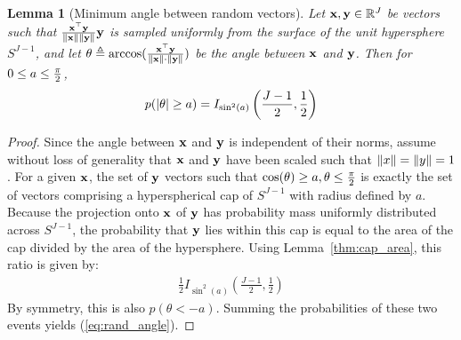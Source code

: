 \documentclass[]{article}
\newtheorem{lemma}{Lemma}[section]
\begin{document}

\begin{lemma}[Minimum angle between random vectors] \label{thm:rand_angle}
Let $\mathbf{x}, \mathbf{y} \in \mathbb{R}^J$ be vectors such that $\frac{\mathbf{x}^\top\mathbf{y}}{\lVert\mathbf{x}\rVert\lVert\mathbf{y}\rVert} \mathbf{y}$ is sampled uniformly from the surface of the unit hypersphere $S^{J-1}$, and let $\theta \triangleq \arccos(\frac{\mathbf{x}^\top\mathbf{y}}{\lVert\mathbf{x}\rVert \cdot \lVert\mathbf{y}\rVert })$ be the angle between $\mathbf{x}$ and $\mathbf{y}$. Then for $0 \le a \le \frac{\pi}{2}$,
\begin{align} \label{eq:rand_angle}
    p(\lvert\theta\rvert \ge a) = I_{\sin^2(a)} \left( \frac{J-1}{2}, \frac{1}{2} \right)
\end{align}
\end{lemma}

\begin{proof} Since the angle between $\mathbf{x}$ and $\mathbf{y}$ is independent of their norms, assume without loss of generality that $\mathbf{x}$ and $\mathbf{y}$ have been scaled such that $\lVert x\rVert = \lVert y\rVert = 1$. %
For a given $\mathbf{x}$, the set of $\mathbf{y}$ vectors such that $\cos(\theta) \ge a, \theta \le \frac{\pi}{2}$ is exactly the set of vectors comprising a hyperspherical cap of $S^{J-1}$ with radius defined by $a$.
Because the projection onto $\mathbf{x}$ of $\mathbf{y}$ has probability mass uniformly distributed across $S^{J-1}$, the probability that $\mathbf{y}$ lies within this cap is equal to the area of the cap divided by the area of the hypersphere. Using Lemma~\ref{thm:cap_area}, this ratio is given by:
\begin{align} \label{eq:beta_survival}
    \frac{1}{2} I_{\sin^2(a)} \left( \frac{J-1}{2}, \frac{1}{2} \right)
\end{align}
By symmetry, this is also $p(\theta < -a)$. Summing the probabilities of these two events yields (\ref{eq:rand_angle}).

%
\end{proof}

\end{document}
